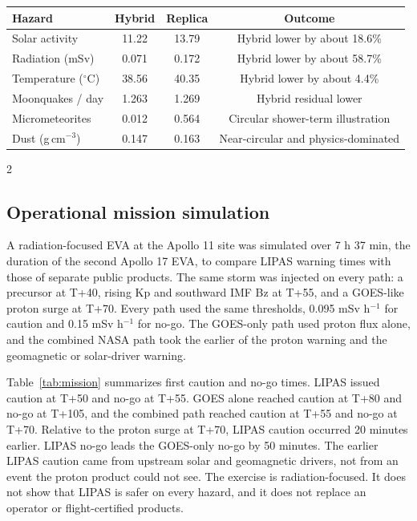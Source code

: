 \begin{center}
\centering
\begin{tabular}{@{}lccc@{}}
\toprule
Hazard & Hybrid & Replica & Outcome \\
\midrule
Solar activity & 11.22 & 13.79 & Hybrid lower by about 18.6\% \\
Radiation (mSv) & 0.071 & 0.172 & Hybrid lower by about 58.7\% \\
Temperature ($^\circ$C) & 38.56 & 40.35 & Hybrid lower by about 4.4\% \\
Moonquakes / day & 1.263 & 1.269 & Hybrid residual lower \\
Micrometeorites & 0.012 & 0.564 & Circular shower-term illustration \\
Dust (g\,cm$^{-3}$) & 0.147 & 0.163 & Near-circular and physics-dominated \\
\bottomrule
\end{tabular}
\label{tab:winB}
\end{center}

\begin{multicols}{2}
\subsection{Operational mission simulation}

A radiation-focused EVA at the Apollo 11 site was simulated over 7 h 37 min, the duration of the second Apollo 17 EVA, to compare LIPAS warning times with those of separate public products. The same storm was injected on every path: a precursor at T+40, rising Kp and southward IMF Bz at T+55, and a GOES-like proton surge at T+70. Every path used the same thresholds, 0.095 mSv h$^{-1}$ for caution and 0.15 mSv h$^{-1}$ for no-go. The GOES-only path used proton flux alone, and the combined NASA path took the earlier of the proton warning and the geomagnetic or solar-driver warning.

Table~\ref{tab:mission} summarizes first caution and no-go times. LIPAS issued caution at T+50 and no-go at T+55. GOES alone reached caution at T+80 and no-go at T+105, and the combined path reached caution at T+55 and no-go at T+70. Relative to the proton surge at T+70, LIPAS caution occurred 20 minutes earlier. LIPAS no-go leads the GOES-only no-go by 50 minutes. The earlier LIPAS caution came from upstream solar and geomagnetic drivers, not from an event the proton product could not see. The exercise is radiation-focused. It does not show that LIPAS is safer on every hazard, and it does not replace an operator or flight-certified products.
\end{multicols}


